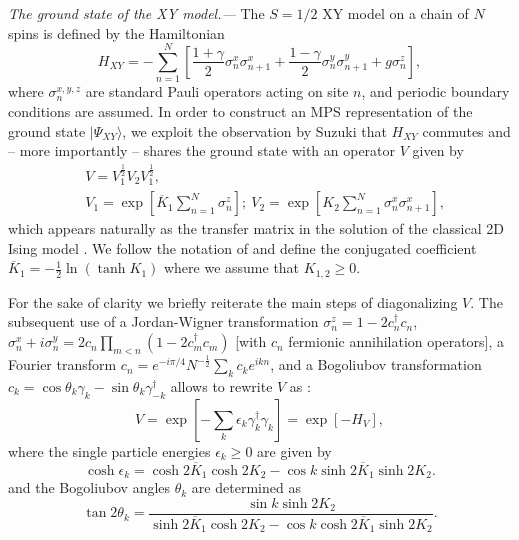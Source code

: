 \documentclass[prl,twocolumn,showpacs,floatfix,superscriptaddress,nofootinbib]{revtex4-1}
\newcommand{\Br}[1]{\left[#1\right]}
\begin{document}
{\it The ground state of the XY model.--- } The $S=1/2$ XY model on a chain of $N$ spins is defined by the Hamiltonian
\small
\begin{equation} \label{eq:HXY}
   H_{XY} = -\sum_{n=1}^N\Br{\frac{1+\gamma}{2} \sigma_n^x \sigma_{n+1}^x+\frac{1-\gamma}{2} \sigma_n^y \sigma_{n+1}^y + g \sigma^z_n},
\end{equation}
\normalsize
where $\sigma^{x,y,z}_n$ are standard Pauli operators acting on site $n$, and periodic boundary conditions are assumed.
In order to construct an MPS representation of the ground state $|\Psi_{XY} \rangle$, we exploit the observation by Suzuki \cite{Suzuki1971} that $H_{XY}$ commutes and -- more importantly -- shares the ground state with an operator $V$ given by
\begin{eqnarray}  \label{eq:Vop} 
      &V = V_1^{\frac12} V_2 V_1^{\frac12}, \\
      &V_1 = \exp\Br{\overline K_1 \sum_{n=1}^N \sigma^z_n};  \ V_2 = \exp\Br{ K_2 \sum_{n=1}^N \sigma^x_n \sigma^x_{n+1}}, \nonumber
\end{eqnarray}
which appears naturally as the transfer matrix in the solution of the classical 2D Ising model \cite{RMP_LSM}.
We follow the notation of \cite{RMP_LSM} and define the conjugated coefficient $\overline K_1 = -\frac12 \ln (\tanh K_1)$ where we assume that $K_{1,2} \ge 0$. 

For the sake of clarity we briefly reiterate the main steps of diagonalizing $V$. The subsequent use of a Jordan-Wigner transformation  
$\sigma^z_n = 1-2 c_n^\dagger c_n$, $\sigma^x_n + i \sigma^y_n = 2 c_n \prod_{m<n} \left( 1-2 c^\dagger_m c_m \right)$ 
[with $c_n$ fermionic annihilation operators], a Fourier transform 
$c_n = e^{-i \pi/4} N^{-\frac12} \sum_k c_k e^{i k n}$, 
and a Bogoliubov transformation 
$c_k =\cos \theta_k \gamma_k - \sin \theta_k \gamma_{-k}^\dagger$ 
allows to rewrite $V$ as \cite{2DIsing_comment,normalization_comment}:
\begin{equation} \label{eq:Vdiag}
V = \exp \left[- \sum_k \epsilon_k \gamma_k^\dagger \gamma_{k} \right]=\exp \left[- H_V \right],
\end{equation}
where the single particle energies $\epsilon_k \ge 0$ are given by
\begin{equation*}
   \cosh \epsilon_k = \cosh 2 \overline K_1 \cosh 2 K_2 - \cos k \sinh 2 \overline K_1 \sinh 2 K_2.
\end{equation*} 
and the Bogoliubov angles $\theta_k$ are determined as
\begin{equation*}
   \tan 2 \theta_k = \frac{\sin k  \sinh 2 K_2}{  \sinh 2 \overline K_1 \cosh 2 K_2 - \cos k \cosh 2 \overline K_1 \sinh 2 K_2  }.
\end{equation*}
\end{document}
